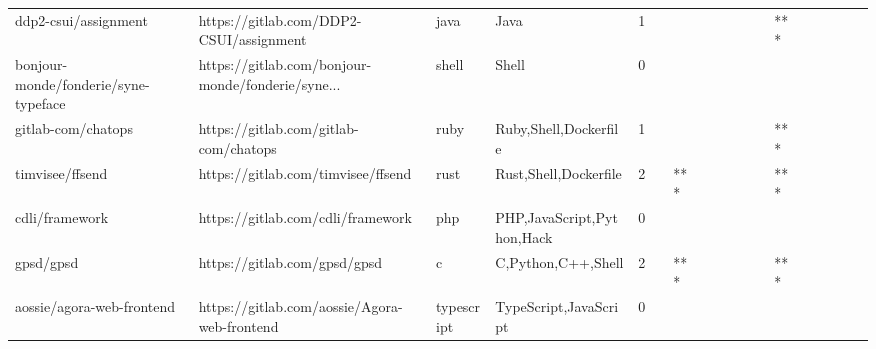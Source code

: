 \begin{tabular}{llllrlllllllllllll}
ddp2-csui/assignment                               &            https://gitlab.com/DDP2-CSUI/assignment &              java &                                               Java &       1 &         &        &           &                &                 &        &           &       *** &          &          &       &              &          \\
bonjour-monde/fonderie/syne-typeface               &  https://gitlab.com/bonjour-monde/fonderie/syne... &             shell &                                              Shell &       0 &         &        &           &                &                 &        &           &           &          &          &       &              &          \\
gitlab-com/chatops                                 &              https://gitlab.com/gitlab-com/chatops &              ruby &                              Ruby,Shell,Dockerfile &       1 &         &        &           &                &                 &        &           &       *** &          &          &       &              &          \\
timvisee/ffsend                                    &                 https://gitlab.com/timvisee/ffsend &              rust &                              Rust,Shell,Dockerfile &       2 &         &    *** &           &                &                 &        &           &       *** &          &          &       &              &          \\
cdli/framework                                     &                  https://gitlab.com/cdli/framework &               php &                         PHP,JavaScript,Python,Hack &       0 &         &        &           &                &                 &        &           &           &          &          &       &              &          \\
gpsd/gpsd                                          &                       https://gitlab.com/gpsd/gpsd &                 c &                                 C,Python,C++,Shell &       2 &         &    *** &           &                &                 &        &           &       *** &          &          &       &              &          \\
aossie/agora-web-frontend                          &       https://gitlab.com/aossie/Agora-web-frontend &        typescript &                              TypeScript,JavaScript &       0 &         &        &           &                &                 &        &           &           &          &          &       &              &          \\

\end{tabular}
